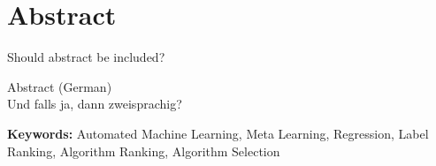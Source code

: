 %
\chapter*{Abstract}
\label{sec:abstract}
\vspace*{-10mm}

Should abstract be included?






\vspace*{20mm}

{Abstract (German)}\label{sec:abstract-german} \\

Und falls ja, dann zweisprachig?

\textbf{Keywords: } Automated Machine Learning, Meta Learning, Regression, Label Ranking, Algorithm Ranking, Algorithm Selection
